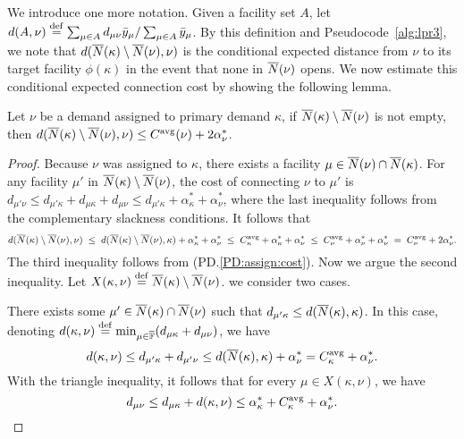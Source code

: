 We introduce one more notation. Given a facility set $A$,
let $d(A,\nu) \stackrel{\mathrm{def}}{=}\sum_{\mu\in A}
d_{\mu\nu}{\bar y}_{\mu}/\sum_{\mu\in A} {\bar y}_{\mu}$. By this
definition and Pseudocode~\ref{alg:lpr3}, we note that
$d({\overline{N}}(\kappa) \setminus {\overline{N}}(\nu), \nu)$ is the
conditional expected distance from $\nu$ to its target
facility $\phi(\kappa)$ in the event that none in
${\overline{N}}(\nu)$ opens. We now estimate this conditional
expected connection cost by showing the following lemma.
\begin{lemma}
  \label{lem:echu indirect}
  Let $\nu$ be a demand assigned to primary demand $\kappa$,
  if ${\overline{N}}(\kappa) \setminus {\overline{N}}(\nu)$ is not empty,
  then $d({\overline{N}}(\kappa) \setminus {\overline{N}}(\nu), \nu) \leq
  C^{{\mbox{\scriptsize\rm avg}}}(\nu)+2\alpha_{\nu}^\ast$.
\end{lemma}
\begin{proof}
  Because $\nu$ was assigned to $\kappa$, there exists a
  facility $\mu\in {\overline{N}}(\nu)\cap {\overline{N}}(\kappa)$.  For any
  facility $\mu'$ in ${\overline{N}}(\kappa) \setminus {\overline{N}}(\nu)
  $, the cost of connecting $\nu$ to $\mu'$ is $ d_{\mu'
    \nu} \le d_{\mu' \kappa}+ d_{\mu\kappa}+d_{\mu\nu} \le
  d_{\mu' \kappa}+\alpha_{\kappa}^\ast + \alpha_{\nu}^\ast$,
  where the last inequality follows from the complementary
  slackness conditions. It follows that
%
\begin{equation}
	\label{eqn: 1.76 connection cost}
  d({\overline{N}}(\kappa)\setminus {\overline{N}}(\nu), \nu) \;\leq\;
  d({\overline{N}}(\kappa)\setminus {\overline{N}}(\nu), \kappa)  + \alpha_{\kappa}^\ast + \alpha_{\nu}^\ast
  \;\leq\; C^{{\mbox{\scriptsize\rm avg}}}_{\kappa} + \alpha_{\kappa}^\ast + \alpha_{\nu}^\ast
  \;\leq\; C^{{\mbox{\scriptsize\rm avg}}}_{\nu} + \alpha_{\nu}^\ast + \alpha_{\nu}^\ast\;=\; C^{{\mbox{\scriptsize\rm avg}}}_{\nu} + 2\alpha_{\nu}^\ast.
\end{equation}
%
The third inequality follows from
(PD.\ref{PD:assign:cost}). Now we argue the second
inequality. Let
$X(\kappa,\nu)\stackrel{\mathrm{def}}{=}{\overline{N}}(\kappa)
\setminus {\overline{N}}(\nu)$. we consider two cases.

 There exists some $\mu'\in {\overline{N}}(\kappa) \cap
{\overline{N}}(\nu)$ such that $d_{\mu' \kappa} \leq
d({\overline{N}}(\kappa), \kappa)$. In this case, denoting
$d(\kappa, \nu)
\stackrel{\mathrm{def}}{=}\min_{\mu\in\overline{\mathbb{F}}}
(d_{\mu\kappa} + d_{\mu\nu})$, we have
\begin{equation*}
  d(\kappa,\nu)\leq
  d_{\mu'\kappa} + d_{\mu'\nu} \leq d({\overline{N}}(\kappa),\kappa) +
  \alpha_{\nu}^\ast=C^{{\mbox{\scriptsize\rm avg}}}_{\kappa} + \alpha_{\nu}^\ast. 
\end{equation*}
With the triangle inequality, it follows that for every
$\mu\in X(\kappa,\nu)$, we have
\begin{equation*}
  d_{\mu\nu} \leq d_{\mu\kappa} + d(\kappa,\nu) \leq
  \alpha_{\kappa}^\ast + C^{{\mbox{\scriptsize\rm avg}}}_{\kappa} + \alpha_{\nu}^\ast.
\end{equation*}


\end{proof}
